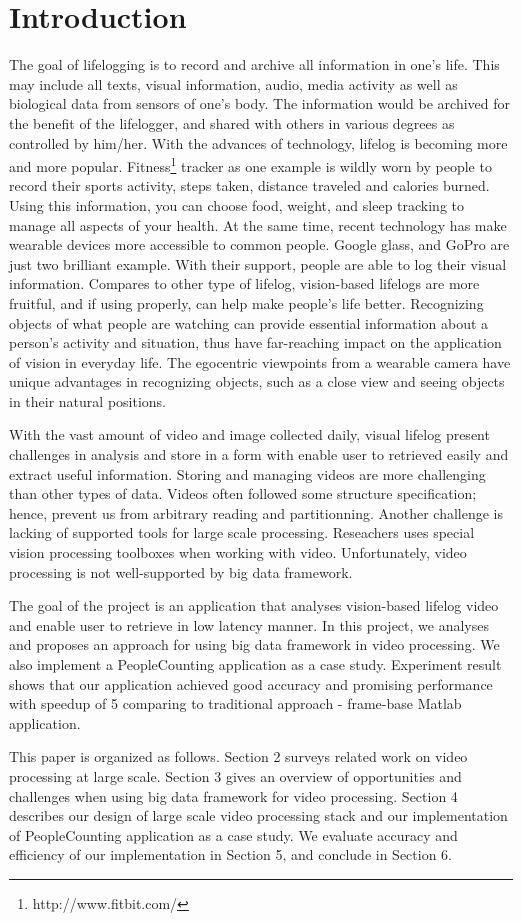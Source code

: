 \section{Introduction}
\label{sec:sec_intro}

The goal of lifelogging is to record and archive all information in one's life. 
This may include all texts, visual information, audio, media activity as well 
as biological data from sensors of one's body. The information would be archived
for the benefit of the lifelogger, and shared with others in various degrees as
controlled by him/her.  With the advances of technology, lifelog is becoming more
 and more popular. Fitness\footnote{http://www.fitbit.com/} tracker as one
 example is wildly worn by people to record  their sports activity, steps taken, distance traveled and calories
 burned.  Using this information, you can choose food, weight, and sleep
 tracking  to manage all aspects of your health.  At the same time, recent 
 technology has make wearable devices more accessible to common people. Google
 glass, and GoPro are just two brilliant example. With their support,  people
 are able to log their visual information.
Compares to other type of lifelog, vision-based lifelogs are more fruitful, and
if using properly, can help make people's life better. Recognizing objects of 
what people are watching can provide essential information about a person's 
activity and situation, thus have far-reaching impact on the application of 
vision in everyday life. The egocentric viewpoints from a wearable camera have
unique advantages in recognizing objects, such as a close view and seeing
objects in their natural positions.

With the vast amount of video and image collected daily, visual lifelog present 
challenges in analysis and store in a form with enable user to retrieved easily 
and extract useful information. Storing and managing videos are more challenging
than other types of data. Videos often followed some structure specification;
hence, prevent us from arbitrary reading and partitionning. Another challenge
is lacking of supported tools for large scale processing. Reseachers uses
special vision processing toolboxes when working with video. Unfortunately,
video processing is not well-supported by big data framework.

The goal of the project is an application that 
analyses vision-based lifelog video and enable user to retrieve in low
latency manner. In this project, we analyses and proposes an approach for using
big data framework in video processing. We also implement a PeopleCounting
application as a case study. Experiment result shows that our application
achieved good accuracy and promising performance with speedup of 5 comparing to
traditional approach - frame-base Matlab application.

This paper is organized as follows. Section 2 surveys related work on video
processing at large scale. Section 3 gives an overview of opportunities
and challenges when using big data framework for video processing. Section 4
describes our design of large scale video processing stack and our
implementation of PeopleCounting application as a case study. We evaluate
accuracy and efficiency of our implementation in Section 5, and conclude in
Section 6.
